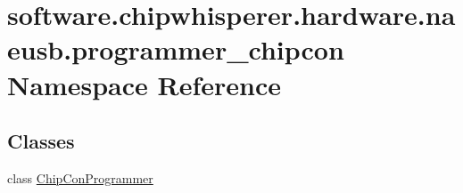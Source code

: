 \hypertarget{namespacesoftware_1_1chipwhisperer_1_1hardware_1_1naeusb_1_1programmer__chipcon}{}\section{software.\+chipwhisperer.\+hardware.\+naeusb.\+programmer\+\_\+chipcon Namespace Reference}
\label{namespacesoftware_1_1chipwhisperer_1_1hardware_1_1naeusb_1_1programmer__chipcon}
\subsection*{Classes}
\begin{DoxyCompactItemize}
\item 
class \hyperlink{classsoftware_1_1chipwhisperer_1_1hardware_1_1naeusb_1_1programmer__chipcon_1_1ChipConProgrammer}{Chip\+Con\+Programmer}
\end{DoxyCompactItemize}
